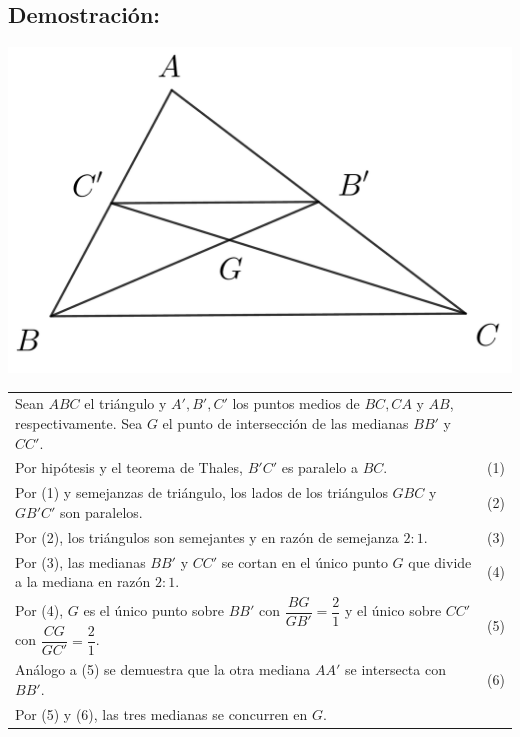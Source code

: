 \documentclass[12pt,a4paper]{article}
\begin{document}
\subsection*{Demostración:}
\begin{center}
\includegraphics[scale=0.8]{medianas.png} 
\end{center}
\begin{tabular}{p{15.9 cm} p{1cm}}
Sean $ABC$ el triángulo y $A', B', C'$ los puntos medios de $BC, CA$ y $AB$, respectivamente. Sea $G$ el punto de intersección de las medianas $BB'$ y $CC'$. 
\\Por hipótesis y el teorema de Thales, $B'C'$ es paralelo a $BC$. &(1)
\\Por (1) y semejanzas de triángulo, los lados de los triángulos $GBC$ y $GB'C'$ son paralelos. &(2)
\\Por (2), los triángulos son semejantes y en razón de semejanza $2:1.$ &(3)
\\Por (3), las medianas $BB'$  y $CC'$ se cortan en el único punto $G$ que divide a la mediana en razón $2:1$. &\medskip(4)
\\Por (4), $G$ es el único punto sobre $BB'$ con $\dfrac{BG}{GB'}=\dfrac{2}{1}$ y el único sobre $CC'$ con $\dfrac{CG}{GC'}=\dfrac{2}{1}$. &(5)
\\Análogo a (5) se demuestra que la otra mediana $AA'$ se intersecta con $BB'$. &(6)
\\Por (5) y (6), las tres medianas se concurren en $G$.
\end{tabular}
\end{document}
